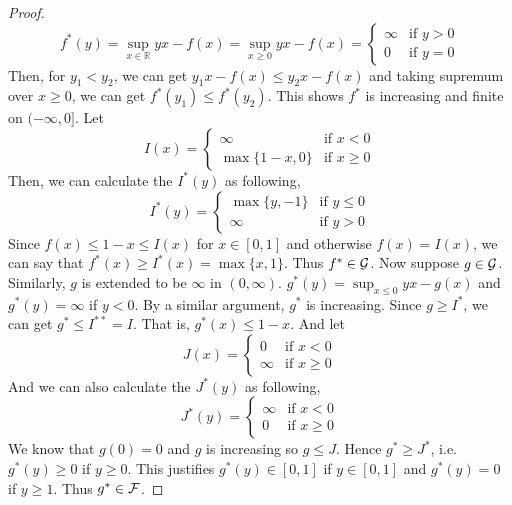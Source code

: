 \documentclass{article}
\begin{document}
\begin{lemma}
\begin{proof}
\begin{equation*}
    f^*(y) = \sup_{x\in \mathbb{R}}yx - f(x) = \sup_{x\ge 0} yx - f(x) = \begin{cases}
        \infty &\text{if } y>0  \\ 0 &\text{if } y=0 
    \end{cases}
\end{equation*}
Then, for $y_1 < y_2$, we can get $y_1x - f(x) \le y_2x - f(x)$ and taking supremum over $x \ge 0$, we can get $f^*(y_1) \le f^*(y_2)$. This shows $f^*$ is increasing and finite on $(-\infty,0]$. Let
\begin{equation*}
    I(x) = \begin{cases}
        \infty &\text{if } x < 0 \\
        \max\{1-x,0\} &\text{if } x\ge0 
    \end{cases}
\end{equation*}
Then, we can calculate the $I^*(y)$ as following,
\begin{equation*}
    I^*(y) = \begin{cases}
        \max\{y,-1\} &\text{if } y\le 0\\
        \infty &\text{if } y>0
    \end{cases}
\end{equation*}
Since $f(x) \le 1-x \le I(x)$ for $x\in [0,1]$ and otherwise $f(x) = I(x)$, we can say that $f^*(x) \ge I^*(x) = \max\{x,1\}$. Thus $f^* \in {\mathcal{G}}$. \newline
Now suppose $g \in {\mathcal{G}}$. Similarly, $g$ is extended to be $\infty$ in $(0,\infty)$. $g^*(y) = \sup_{x\le 0}yx-g(x)$ and $g^*(y) =\infty$ if $y<0$. By a similar argument, $g^*$ is increasing. Since $g \ge I^*$, we can get $g^* \le I^{**} = I$. That is, $g^*(x) \le 1-x$. And let
\begin{equation*}
    J(x) = \begin{cases}
        0 & \text{if }x<0\\
        \infty &\text{if }x\ge 0
    \end{cases}
\end{equation*}
And we can also calculate the $J^*(y)$ as following,
\begin{equation*}
    J^*(y) = \begin{cases}
        \infty &\text{if } x<0 \\
        0 &\text{if } x\ge0
    \end{cases}
\end{equation*}
We know that $g(0) = 0$ and $g$ is increasing so $g \le J$. Hence $g^* \ge J^*$, i.e. $g^*(y) \ge 0$ if $y\ge 0$. This justifies $g^*(y) \in [0,1]$ if $y\in [0,1]$ and $g^*(y) = 0$ if $y\ge1$. Thus $g^* \in {\mathcal{F}}$.

\end{proof}
\end{lemma}
\end{document}
